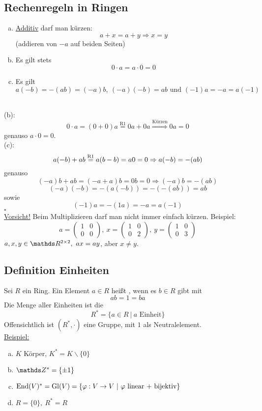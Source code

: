 \subsection{Rechenregeln in Ringen}
\label{sub:rechenregeln_ringen}
\begin{enumerate}[(a)]
	\item \uline{Additiv} darf man kürzen:
	\[
	a+x=a+y\Rightarrow x=y
	\]
	(addieren von $-a$ auf beiden Seiten)
	\item Es gilt stets 
	\[
	0\cdot a=a\cdot 0=0
	\]
	\item Es gilt 
	\[
	a(-b)=-(ab)=(-a)b,~ (-a)(-b)=ab \text{ und } (-1)a=-a=a(-1)
	\]
\end{enumerate}

\\
(b):
\[
0\cdot a =(0+0)a\stackrel{\text{R1}}{=}0a+0a\stackrel{\text{Kürzen}}{\Rightarrow} 0a=0
\]
genauso $a\cdot 0=0$.\\
(c): 
\[
a(-b)+ab\stackrel{\text{R1}}{=} a(b-b)=a0=0\Rightarrow a(-b)=-(ab)
\]
genauso
\[
(-a)b+ab=(-a+a)b=0b=0\Rightarrow (-a)b=-(ab)
\]
\[
(-a)(-b)=-(a(-b))=-(-(ab))=ab
\]
sowie
\[
(-1)a=-(1a)=-a=a(-1)
\]
\hfill $\square$\\
\uline{Vorsicht!} Beim Multiplizieren darf man nicht immer einfach kürzen. Beispiel:
\[
a=\begin{pmatrix}1&0\\0&0\end{pmatrix},~x=\begin{pmatrix}1&0\\0&2\end{pmatrix},~y=\begin{pmatrix}1&0\\0&3\end{pmatrix}
\]
$a,x,y\in \R^{2\times 2},~ ax=ay$, aber $x\neq y$.

\subsection{Definition Einheiten}
\label{sub:def_einheiten}
Sei $R$ ein Ring. Ein Element $a\in R$ heißt , wenn es $b\in R$ gibt mit 
\[
ab=1=ba
\]
Die Menge aller Einheiten ist die 
\[
R^*=\{a\in R~|~a\text{ Einheit}\}
\]
Offensichtlich ist $(R^*,\cdot)$ eine Gruppe, mit $1$ als Neutralelement.\\

\uline{Beispiel:}
\begin{enumerate}[(a)]
	\item $K$ Körper, $K^*=K\backslash \{0\}$
	\item $\Z^*=\{\pm 1\}$
	\item $\operatorname{End}(V)^*=\operatorname{Gl}(V)=\{\varphi:V\to V~|~\varphi\text{ linear + bijektiv}\}$
	\item $R=\{0\},~R^*=R$
\end{enumerate}

